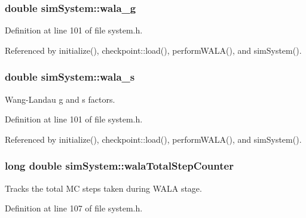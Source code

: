 \hypertarget{classsim_system_aa2e866e69ebe5fa0761894212592175a}{
\subsubsection[{wala\-\_\-g}]{\setlength{\rightskip}{0pt plus 5cm}double sim\-System\-::wala\-\_\-g}}\label{classsim_system_aa2e866e69ebe5fa0761894212592175a}


Definition at line 101 of file system.\-h.



Referenced by initialize(), checkpoint\-::load(), perform\-W\-A\-L\-A(), and sim\-System().

\hypertarget{classsim_system_a7cc3431bb59acca9165b044dbd07dcdc}{
\subsubsection[{wala\-\_\-s}]{\setlength{\rightskip}{0pt plus 5cm}double sim\-System\-::wala\-\_\-s}}\label{classsim_system_a7cc3431bb59acca9165b044dbd07dcdc}


Wang-\/\-Landau g and s factors. 



Definition at line 101 of file system.\-h.



Referenced by initialize(), checkpoint\-::load(), perform\-W\-A\-L\-A(), and sim\-System().

\hypertarget{classsim_system_a46f5d3a8843821b45fd3f4d9234a177f}{
\subsubsection[{wala\-Total\-Step\-Counter}]{\setlength{\rightskip}{0pt plus 5cm}long double sim\-System\-::wala\-Total\-Step\-Counter}}\label{classsim_system_a46f5d3a8843821b45fd3f4d9234a177f}


Tracks the total M\-C steps taken during W\-A\-L\-A stage. 



Definition at line 107 of file system.\-h.



